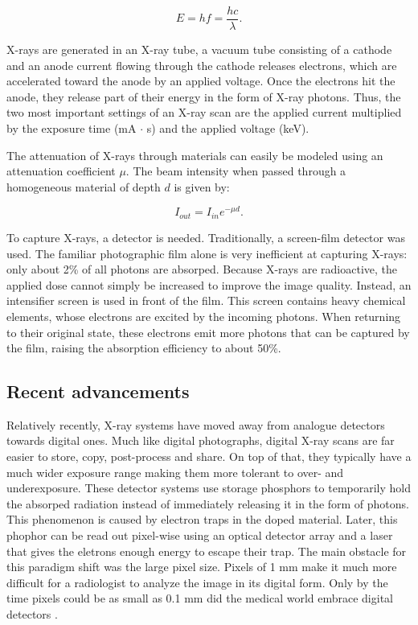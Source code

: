 \begin{equation}
	E = hf = \frac{hc}{\lambda}.
\end{equation}

X-rays are generated in an X-ray tube, a vacuum tube consisting of a cathode and
an anode current flowing through the cathode releases electrons,
which are accelerated toward the anode by an applied voltage. Once the electrons
hit the anode, they release part of their energy in the form of X-ray photons.
Thus, the two most important settings of an X-ray scan are the applied
current multiplied by the exposure time (mA $\cdot$ s) and the applied voltage
(keV).

The attenuation of X-rays through materials can easily be modeled using an
attenuation coefficient $\mu$. The beam intensity when passed through a
homogeneous material of depth $d$ is given by: 

\begin{equation}
	I_{out} = I_{in} e^{-\mu d}.
\end{equation}

To capture X-rays, a detector is needed. Traditionally, a screen-film detector
was used. The familiar photographic film alone is very inefficient
at capturing X-rays: only about 2\% of all photons are absorped. Because X-rays
are radioactive, the applied dose cannot simply be increased to improve the
image quality. Instead, an intensifier screen is used in front of the film. This
screen contains heavy chemical elements, whose electrons are excited by the
incoming photons. When returning to their original state, these electrons emit
more photons that can be captured by the film, raising the absorption efficiency
to about 50\%.


\subsection{Recent advancements}
Relatively recently, X-ray systems have moved away from analogue detectors
towards digital ones. Much like digital photographs, digital X-ray scans are far
easier to store, copy, post-process and share. On top of that, they typically
have a much wider exposure range making them more tolerant to over- and
underexposure. These detector systems use storage phosphors to temporarily hold
the absorped radiation instead of immediately releasing it in the form of
photons. This phenomenon is caused by electron traps in the doped material.
Later, this phophor can be read out pixel-wise using an optical detector array
and a laser that gives the eletrons enough energy to escape their trap. The main
obstacle for this paradigm shift was the large pixel size. Pixels of 1 mm make
it much more difficult for a radiologist to analyze the image in its digital
form. Only by the time pixels could be as small as 0.1 mm did the medical world
embrace digital detectors \cite{review}.

